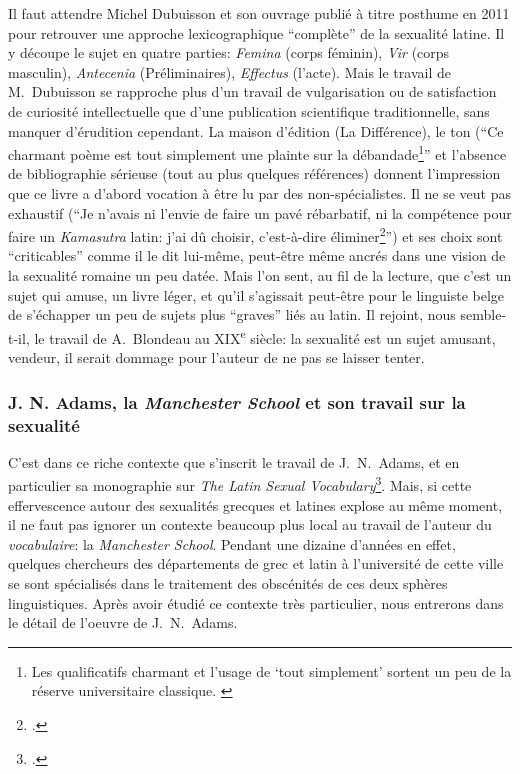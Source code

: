 Il faut attendre Michel Dubuisson et son ouvrage publié à titre posthume en 2011 pour retrouver une approche lexicographique \enquote{complète} de la sexualité latine. Il y découpe le sujet en quatre parties: \textit{Femina} (corps féminin), \textit{Vir} (corps masculin), \textit{Antecenia} (Préliminaires), \textit{Effectus} (l'acte). Mais le travail de M.~Dubuisson se rapproche plus d'un travail de vulgarisation ou de satisfaction de curiosité intellectuelle que d'une publication scientifique traditionnelle, sans manquer d'érudition cependant. La maison d'édition (La Différence), le ton (\enquote{Ce charmant poème est tout simplement une plainte sur la débandade\footnote{Les qualificatifs charmant et l'usage de \enquote{tout simplement} sortent un peu de la réserve universitaire classique. \textcite[p.~21]{dubuisson_lasciva_2011}}} et l'absence de bibliographie sérieuse (tout au plus quelques références) donnent l'impression que ce livre a d'abord vocation à être lu par des non-spécialistes. Il ne se veut pas exhaustif (\enquote{Je n'avais ni l'envie de faire un pavé rébarbatif, ni la compétence pour faire un \textit{Kamasutra} latin: j'ai dû choisir, c'est-à-dire éliminer\footcite[p.~13]{dubuisson_lasciva_2011}}) et ses choix sont \enquote{criticables} comme il le dit lui-même, peut-être même ancrés dans une vision de la sexualité romaine un peu datée. Mais l'on sent, au fil de la lecture, que c'est un sujet qui amuse, un livre léger, et qu'il s'agissait peut-être pour le linguiste belge de s'échapper un peu de sujets plus \enquote{graves} liés au latin. Il rejoint, nous semble-t-il, le travail de A.~Blondeau au XIX\textsuperscript{e} siècle: la sexualité est un sujet amusant, vendeur, il serait dommage pour l'auteur de ne pas se laisser tenter.


\subsubsection{J. N. Adams, la \textit{Manchester School} et son travail sur la sexualité}

C'est dans ce riche contexte que s'inscrit le travail de J.~N.~Adams, et en particulier sa monographie sur \textit{The Latin Sexual Vocabulary}\footcite{adams}. Mais, si cette effervescence autour des sexualités grecques et latines explose au même moment, il ne faut pas ignorer un contexte beaucoup plus local au travail de l'auteur du \textit{vocabulaire}: la \textit{Manchester School}. Pendant une dizaine d'années en effet, quelques chercheurs des départements de grec et latin à l'université de cette ville se sont spécialisés dans le traitement des obscénités de ces deux sphères linguistiques. Après avoir étudié ce contexte très particulier, nous entrerons dans le détail de l'oeuvre de J.~N.~Adams.

